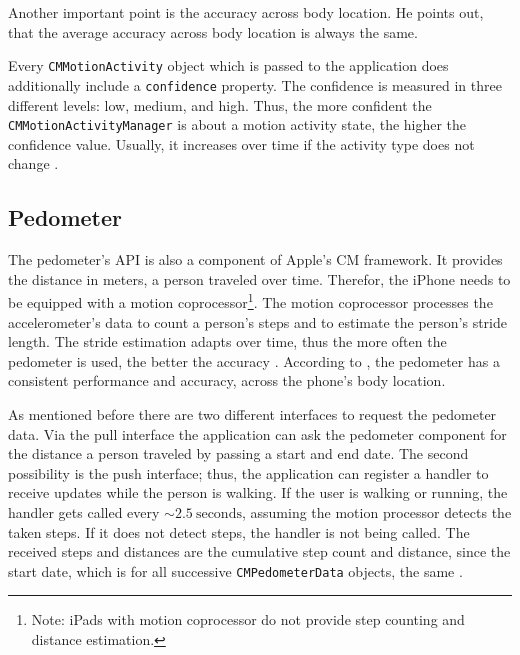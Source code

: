 Another important point is the accuracy across body location. He points out, that the average accuracy across body location is always the same.

Every \texttt{CMMotionActivity} object which is passed to the application does additionally include a \texttt{confidence} property. The confidence is measured in three different levels: low, medium, and high. Thus, the more confident the \texttt{CMMotionActivityManager} is about a motion activity state, the higher the confidence value. Usually, it increases over time if the activity type does not change \citep{apple:wwdc_2014_pham,apple:ios_doc_cm}.


\subsection{Pedometer}
The pedometer's \acs{API} is also a component of Apple's \acs{CM} framework. It provides the distance in meters, a person traveled over time. Therefor, the iPhone needs to be equipped with a motion coprocessor\footnote{Note: iPads with motion coprocessor do not provide step counting and distance estimation.}. The motion coprocessor processes the accelerometer's data to count a person's steps and to estimate the person's stride length. The stride estimation adapts over time, thus the more often the pedometer is used, the better the accuracy \citep{apple:wwdc_2014_pham}. According to \citet{apple:wwdc_2014_pham}, the pedometer has a consistent performance and accuracy, across the phone's body location.

As mentioned before there are two different interfaces to request the pedometer data. Via the pull interface the application can ask the pedometer component for the distance a person traveled by passing a start and end date. The second possibility is the push interface; thus, the application can register a handler to receive updates while the person is walking. If the user is walking or running, the handler gets called every $\sim 2.5~\text{seconds}$, assuming the motion processor detects the taken steps. If it does not detect steps, the handler is not being called. The received steps and distances are the cumulative step count and distance, since the start date, which is for all successive \texttt{CMPedometerData} objects, the same \citep{apple:wwdc_2014_pham}.

